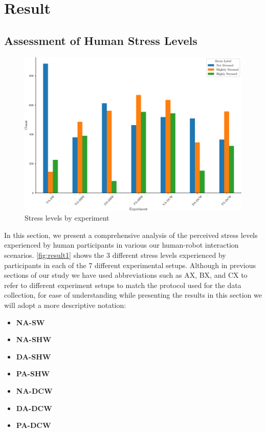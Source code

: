 \chapter{Result}

\section{Assessment of Human Stress Levels}



\begin{figure}[h]
	\centering
	\includegraphics[width=0.9\columnwidth]{images/stress_levels_by_experiment2.pdf}
	\caption{Stress levels by experiment}
	\label{fig:result1}
\end{figure}

In this section, we present a comprehensive analysis of the perceived stress levels experienced by human participants in various our human-robot interaction scenarios. \autoref{fig:result1} shows the 3 different stress levels experienced by participants in each of the 7 different experimental setups.
Although in previous sections of our study we have used abbreviations such as AX, BX, and CX to refer to different experiment setups to match the protocol used for the data collection, for ease of understanding while presenting the results in this section we will adopt a more descriptive notation: 
\begin{itemize}
    \item\textbf{\gls{NA-SW}}
    \item\textbf{\gls{NA-SHW}}
    \item\textbf{\gls{DA-SHW}}
    \item\textbf{\gls{PA-SHW}}
    \item\textbf{\gls{NA-DCW}}
    \item\textbf{\gls{DA-DCW}}
    \item\textbf{\gls{PA-DCW}}
\end{itemize}


